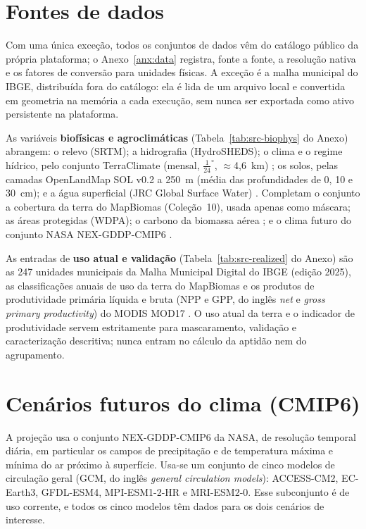 \section{Fontes de dados}

Com uma única exceção, todos os conjuntos de dados vêm do catálogo público da própria
plataforma; o Anexo~\ref{anx:data} registra, fonte a fonte, a resolução nativa e os fatores de
conversão para unidades físicas. A exceção é a malha municipal do IBGE, distribuída fora do catálogo:
ela é lida de um arquivo local e convertida em geometria na memória a cada execução, sem nunca ser
exportada como ativo persistente na plataforma.

As variáveis \textbf{biofísicas e agroclimáticas} (Tabela~\ref{tab:src-biophys} do Anexo) abrangem:
o relevo (SRTM); a hidrografia (HydroSHEDS); o clima e o regime hídrico, pelo conjunto TerraClimate
(mensal, $\tfrac{1}{24}^\circ$, $\approx$4,6~km) \citep{abatzoglou_terraclimate_2018}; os solos, pelas
camadas OpenLandMap SOL v0.2 a 250~m (média das profundidades de 0, 10 e 30~cm); e a água superficial
(JRC Global Surface Water) \citep{pekel_high-resolution_2016}. Completam o conjunto a cobertura da terra
do MapBiomas (Coleção~10), usada apenas como máscara; as áreas protegidas (WDPA); o carbono da biomassa
aérea \citep[p.~1]{spawn_harmonized_2020}; e o clima futuro do conjunto NASA NEX-GDDP-CMIP6
\citep{thrasher_nasa_2022}.

As entradas de \textbf{uso atual e validação} (Tabela~\ref{tab:src-realized} do Anexo) são as 247
unidades municipais da Malha Municipal Digital do IBGE (edição 2025), as classificações anuais de uso da
terra do MapBiomas \citep{souza_reconstructing_2020} e os produtos de produtividade primária líquida e
bruta (NPP e GPP, do inglês \emph{net} e \emph{gross primary productivity}) do MODIS MOD17
\citep{zhao_improvements_2005}. O uso atual da terra e o indicador de produtividade servem estritamente
para mascaramento, validação e caracterização descritiva; nunca entram no cálculo da aptidão nem do
agrupamento.

\section{Cenários futuros do clima (CMIP6)}

A projeção usa o conjunto NEX-GDDP-CMIP6 da NASA, de resolução temporal diária, em particular os campos de
precipitação e de temperatura máxima e mínima do ar próximo à superfície. Usa-se um conjunto de cinco
modelos de circulação geral (GCM, do inglês \emph{general circulation models}): ACCESS-CM2, EC-Earth3,
GFDL-ESM4, MPI-ESM1-2-HR e MRI-ESM2-0. Esse subconjunto é de uso corrente, e todos os cinco modelos
têm dados para os dois cenários de interesse.

